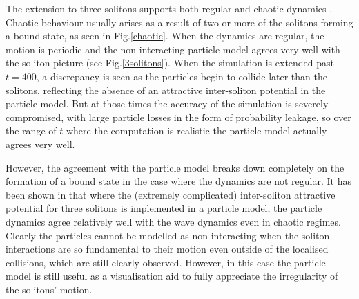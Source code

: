 \documentclass[10pt, twocolumn]{revtex4}    %
\begin{document}
The extension to three solitons supports both regular and chaotic dynamics \cite{Gardiner}. Chaotic behaviour usually arises as a result of two or more of the solitons forming a bound state, as seen in Fig.\ref{chaotic}. When the dynamics are regular, the motion is periodic and the non-interacting particle model agrees very well with the soliton picture (see Fig.\ref{3solitons}). When the simulation is extended past $t=400$, a discrepancy is seen as the particles begin to collide later than the solitons, reflecting the absence of an attractive inter-soliton potential in the particle model. But at those times the accuracy of the simulation is severely compromised, with large particle losses in the form of probability leakage, so over the range of $t$ where the computation is realistic the particle model actually agrees very well. 

However, the agreement with the particle model breaks down completely on the formation of a bound state in the case where the dynamics are not regular. It has been shown in \cite{Martin} that where the (extremely complicated) inter-soliton attractive potential for three solitons is implemented in a particle model, the particle dynamics agree relatively well with the wave dynamics even in chaotic regimes. Clearly the particles cannot be modelled as non-interacting when the soliton interactions are so fundamental to their motion even outside of the localised collisions, which are still clearly observed. However, in this case the particle model is still useful as a visualisation aid to fully appreciate the irregularity of the solitons' motion. 
\end{document}
